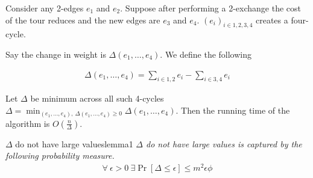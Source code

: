 \documentclass[12pt, a4paper]{article}
\begin{document}
\noindent Consider any 2-edges $e_1$ and $e_2$. Suppose after performing a 2-exchange the cost of the tour reduces and the new edges are $e_3$ and $e_4$. $(e_i)_{i \in {1,2,3,4}}$ creates a four-cycle.

\noindent Say the change in weight is $\Delta(e_1, \dots, e_4)$. We define the following

\begin{align*}
    \Delta(e_1, \dots, e_4) = \displaystyle\sum_{i \in {1,2}} e_i - \displaystyle\sum_{i \in {3,4}} e_i
\end{align*}

\noindent Let $\Delta$ be minimum across all such 4-cycles $\Delta = \min_{(e_1, \dots, e_4), \: \Delta(e_1, \dots, e_4) \geq 0} \Delta(e_1, \dots, e_4)$. Then the running time of the algorithm is $O(\frac{n}{\Delta})$.

\begin{lemma}{$\Delta$ do not have large values}{lemma1}
    \textit{$\Delta$ do not have large values is captured by the following probability measure.}
    \begin{align*}
        \forall \: \epsilon > 0 \: \exists \Pr[\Delta \leq \epsilon] \leq m^2 \epsilon \phi
    \end{align*}
\end{lemma}
\end{document}
